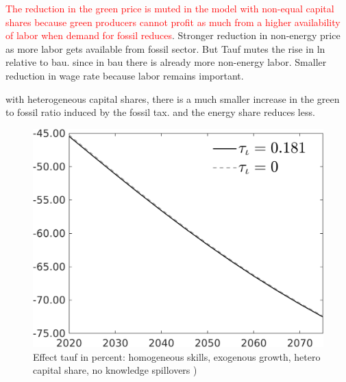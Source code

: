 \documentclass[12pt]{article}
\newcommand{\tr}[1]{\textcolor{red}{#1}}
\begin{document}
\tr{The reduction in the green price is muted in the model with non-equal capital shares because green producers cannot profit as much from a higher availability of labor when demand for fossil reduces}. Stronger reduction in non-energy price as more labor gets available from fossil sector. But Tauf mutes the rise in ln relative to bau. since in bau there is already more non-energy labor. Smaller reduction in wage rate because labor remains important. 

with heterogeneous capital shares, there is a much smaller increase in the green to fossil ratio induced by the fossil tax. and the energy share reduces less. 
\begin{figure}[h!!]
	\centering
	\caption{Effect tauf in percent: homogeneous skills, exogenous growth, hetero capital share, no knowledge spillovers )}\label{fig:Leveltauf_nsk1_xgr1_noknow_notaul}
	\begin{minipage}[]{0.32\textwidth}
		\includegraphics[width=1\textwidth]{../../codding_model/own_basedOnFried/optimalPol_010922_revision/figures/all_13Sept22/PerdifNoTauf_regime0_CompTaul_Emnet_spillover0_nsk1_xgr1_knspil1_sep1_LFlimit0_emsbase0_countec0_GovRev0_etaa0.79_lgd1.png}
	\end{minipage}	
	\begin{minipage}[]{0.32\textwidth}

\end{minipage}
\end{figure}
\end{document}
